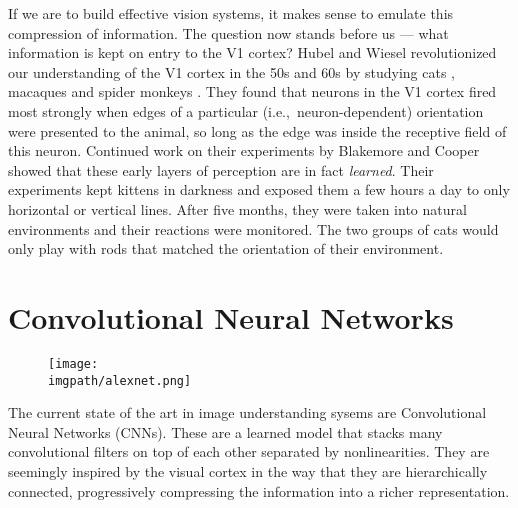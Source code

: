 If we are to build effective vision systems, it makes sense to emulate this
compression of information.
The question now stands before us --- what information is kept on entry to the V1 cortex?
Hubel and Wiesel revolutionized our understanding of the V1 cortex in the 50s and 60s by 
studying cats \cite{hubel_receptive_1959, hubel_receptive_1962}, macaques and spider 
monkeys \cite{hubel_receptive_1968}. They found that neurons in the V1 cortex fired
most strongly when edges of a particular (i.e.,\ neuron-dependent) orientation
were presented to the animal, so long as the edge was inside the receptive field of
this neuron.
Continued work on their experiments by Blakemore and Cooper
\cite{blakemore_development_1970} showed that these early layers of perception
are in fact \emph{learned}. Their experiments kept kittens in darkness and exposed
them a few hours a day to only horizontal or vertical lines. After five months, they were
taken into natural environments and their reactions were monitored. The two groups of cats
would only play with rods that matched the orientation of their environment.

\section{Convolutional Neural Networks}
\begin{figure}
  \centering
    \texttt{[image: \\imgpath/alexnet.png]}
    \label{fig:ch1:cnn_arch}
  \end{figure}
The current state of the art in image understanding sysems are 
Convolutional Neural Networks (CNNs). These are a learned model that
stacks many convolutional filters on top of each other separated by
nonlinearities. 
They are seemingly inspired by the visual cortex in the way that they are
hierarchically connected, progressively compressing the information into a
richer representation. 

